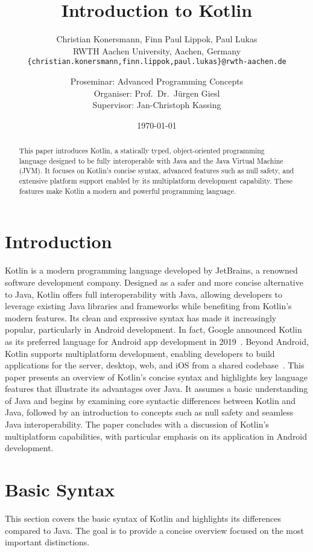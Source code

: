 \documentclass[a4paper,11pt]{article}
\title{\huge \bfseries Introduction to Kotlin}
\author{
  Christian Konersmann, Finn Paul Lippok, Paul Lukas\\[1ex]
  RWTH Aachen University, Aachen, Germany\\
  \texttt{\{christian.konersmann,finn.lippok,paul.lukas\}@rwth-aachen.de}\\
  \and
  Proseminar: Advanced Programming Concepts\\
  Organiser: Prof.\ Dr.\ Jürgen Giesl\\
  Supervisor: Jan-Christoph Kassing
}
\date{\today}
\begin{document}
\maketitle

\begin{abstract}
This paper introduces Kotlin, a statically typed, object-oriented programming language designed to be fully interoperable with Java and the Java Virtual Machine (JVM). It focuses on Kotlin's concise syntax, advanced features such as null safety, and extensive platform support enabled by its multiplatform development capability. These features make Kotlin a modern and powerful programming language.
\end{abstract}

\section{Introduction}
Kotlin is a modern programming language developed by JetBrains, a renowned software development company. Designed as a safer and more concise alternative to Java, Kotlin offers full interoperability with Java, allowing developers to leverage existing Java libraries and frameworks while benefiting from Kotlin's modern features. Its clean and expressive syntax has made it increasingly popular, particularly in Android development. In fact, Google announced Kotlin as its preferred language for Android app development in 2019~\cite{intro-google}. Beyond Android, Kotlin supports multiplatform development, enabling developers to build applications for the server, desktop, web, and iOS from a shared codebase~\cite{intro-multiplatform-dev}.
This paper presents an overview of Kotlin’s concise syntax and highlights key language features that illustrate its advantages over Java. It assumes a basic understanding of Java and begins by examining core syntactic differences between Kotlin and Java, followed by an introduction to concepts such as null safety and seamless Java interoperability. The paper concludes with a discussion of Kotlin’s multiplatform capabilities, with particular emphasis on its application in Android development.

\section{Basic Syntax}
This section covers the basic syntax of Kotlin and highlights its differences compared to Java. The goal is to provide a concise overview focused on the most important distinctions.
\end{document}
